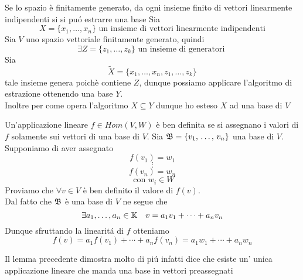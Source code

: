 \begin{prop}
\bianco
Se  lo spazio \`e finitamente generato, da ogni insieme finito di vettori linearmente indipendenti si si pu\'o estrarre una base 
\proof  Sia
$$X=\{ x_1,\dots , x_n \} \text{ un  insieme di vettori linearmente indipendenti} $$
Sia $V$ uno spazio vettoriale finitamente generato, quindi
 $$ \exists Z=\{ z_1,\dots ,z_k \} \text{ un insieme di generatori } $$
Sia $$\tilde{ X} = \{ x_1 , \dots , x_n, z_1, \dots , z_k \} $$
tale insieme genera poich\`e contiene $Z$, dunque possiamo applicare l'algoritmo di estrazione ottenendo una base $Y$.\\
Inoltre per come opera l'algoritmo $ X \subseteq Y$ dunque ho esteso $X$ ad una base di $V$  
\endproof
\end{prop}
\newpage
\begin{lem}  \label{Valori_Base}\bianco
Un'applicazione lineare $f \in Hom( V, W) $  \`e ben definita se si assegnano i valori di $f$ solamente sui  vettori di una base di $V$.
\proof
Sia $\mathfrak{B}= \{ v_1, \, \dots , \, v_n \} $ una base di $V$.\\
Supponiamo di aver assegnato
$$ f(v_1) = w _1 $$ $$\vdots $$ $$ f(v_n)= w_n  $$ $$ \text{ con } w_i \in W  $$
Proviamo che $\forall v \in V $ \`e ben definito il valore di $f(v)$.\\
Dal fatto che $\mathfrak{B}$ \`e una base di $V$ ne segue che 
$$\exists a_1, \dots , a_n \in \mathbb{K} \quad  v= a_1 v_1 + \dots + a_n v_n $$ 
Dunque sfruttando la linearit\'a di $f$ otteniamo 
$$f(v)= a_1 f(v_1) + \cdots + a_n f(v_n) = a_1 w_1 + \cdots + a_n w_n$$
\endproof
\begin{oss} Il lemma precedente dimostra molto di pi\'u infatti dice che esiste un' unica applicazione lineare che manda una base in vettori preassegnati 
\end{oss}
\end{lem}

\newpage
